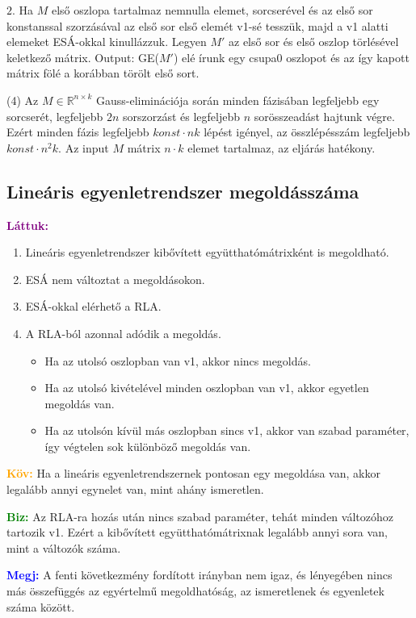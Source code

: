 \documentclass[../szamtud.tex]{subfiles}
\begin{document}
        $\boxed{2.}$ Ha $M$ első oszlopa tartalmaz nemnulla elemet, sorcserével és az első sor konstanssal szorzásával az első sor első elemét v1-sé tesszük, majd a v1 alatti elemeket ESÁ-okkal kinullázzuk. Legyen $M'$ az első sor és első oszlop törlésével keletkező mátrix. Output: GE($M'$) elé írunk egy csupa0 oszlopot és az így kapott mátrix fölé a korábban törölt első sort.

        (4) Az $M \in \mathbb{R}^{n \times k}$ Gauss-eliminációja során minden fázisában legfeljebb egy sorcserét, legfeljebb $2n$ sorszorzást és legfeljebb $n$ sorösszeadást hajtunk végre. Ezért minden fázis legfeljebb $konst \cdot nk$ lépést igényel, az összlépésszám legfeljebb $konst \cdot n^2k$. Az input $M$ mátrix $n \cdot k$ elemet tartalmaz, az eljárás hatékony.

    \subsection{Lineáris egyenletrendszer megoldásszáma}

        \textcolor{purple}{\textbf{Láttuk:}}
            \begin{enumerate}
                \item Lineáris egyenletrendszer kibővített együtthatómátrixként is megoldható.
                \item ESÁ nem változtat a megoldásokon.
                \item ESÁ-okkal elérhető a RLA.
                \item A RLA-ból azonnal adódik a megoldás. \begin{itemize}
                    \item Ha az utolsó oszlopban van v1, akkor nincs megoldás.
                    \item Ha az utolsó kivételével minden oszlopban van v1, akkor egyetlen megoldás van.
                    \item Ha az utolsón kívül más oszlopban sincs v1, akkor van szabad paraméter, így végtelen sok különböző megoldás van.
                \end{itemize}
            \end{enumerate}

        \textcolor{orange}{\textbf{Köv:}} Ha a lineáris egyenletrendszernek pontosan egy megoldása van, akkor legalább annyi egynelet van, mint ahány ismeretlen.

        \textcolor{green}{\textbf{Biz:}} Az RLA-ra hozás után nincs szabad paraméter, tehát minden változóhoz tartozik v1. Ezért a kibővített együtthatómátrixnak legalább annyi sora van, mint a változók száma.

        \textcolor{blue}{\textbf{Megj:}} A fenti következmény fordított irányban nem igaz, és lényegében nincs más összefüggés az egyértelmű megoldhatóság, az ismeretlenek és egyenletek száma között.
\end{document}
